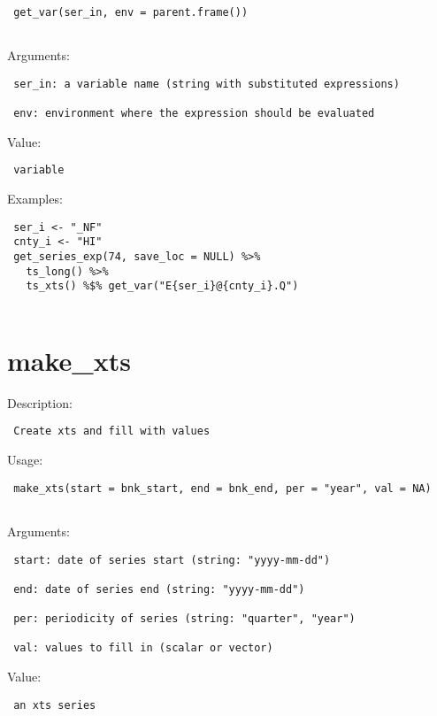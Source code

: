 \documentclass[
  letterpaper,
  DIV=11,
  numbers=noendperiod]{scrreport}
\begin{document}
\begin{verbatim}
 get_var(ser_in, env = parent.frame())
 
\end{verbatim}

Arguments:

\begin{verbatim}
 ser_in: a variable name (string with substituted expressions)

 env: environment where the expression should be evaluated
\end{verbatim}

Value:

\begin{verbatim}
 variable
\end{verbatim}

Examples:

\begin{verbatim}
 ser_i <- "_NF"
 cnty_i <- "HI"
 get_series_exp(74, save_loc = NULL) %>%
   ts_long() %>%
   ts_xts() %$% get_var("E{ser_i}@{cnty_i}.Q")
 
\end{verbatim}

\hypertarget{make_xts}{%
\section{make\_xts}\label{make_xts}}

Description:

\begin{verbatim}
 Create xts and fill with values
\end{verbatim}

Usage:

\begin{verbatim}
 make_xts(start = bnk_start, end = bnk_end, per = "year", val = NA)
 
\end{verbatim}

Arguments:

\begin{verbatim}
 start: date of series start (string: "yyyy-mm-dd")

 end: date of series end (string: "yyyy-mm-dd")

 per: periodicity of series (string: "quarter", "year")

 val: values to fill in (scalar or vector)
\end{verbatim}

Value:

\begin{verbatim}
 an xts series
\end{verbatim}
\end{document}
